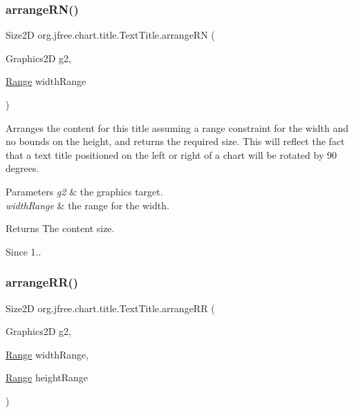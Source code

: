 \subsubsection{\texorpdfstring{arrange\+R\+N()}{arrangeRN()}}
{\footnotesize\ttfamily Size2D org.\+jfree.\+chart.\+title.\+Text\+Title.\+arrange\+RN (\begin{DoxyParamCaption}\item[{Graphics2D}]{g2,  }\item[{\mbox{\hyperlink{classorg_1_1jfree_1_1data_1_1_range}{Range}}}]{width\+Range }\end{DoxyParamCaption})\hspace{0.3cm}{\ttfamily [protected]}}

Arranges the content for this title assuming a range constraint for the width and no bounds on the height, and returns the required size. This will reflect the fact that a text title positioned on the left or right of a chart will be rotated by 90 degrees.


\begin{DoxyParams}{Parameters}
{\em g2} & the graphics target. \\
\hline
{\em width\+Range} & the range for the width.\\
\hline
\end{DoxyParams}
\begin{DoxyReturn}{Returns}
The content size.
\end{DoxyReturn}
\begin{DoxySince}{Since}
1.. 
\end{DoxySince}
\mbox{\label{classorg_1_1jfree_1_1chart_1_1title_1_1_text_title_a6ab494af02c8a1f60f2a7b2a4c086b88}} 
\subsubsection{\texorpdfstring{arrange\+R\+R()}{arrangeRR()}}
{\footnotesize\ttfamily Size2D org.\+jfree.\+chart.\+title.\+Text\+Title.\+arrange\+RR (\begin{DoxyParamCaption}\item[{Graphics2D}]{g2,  }\item[{\mbox{\hyperlink{classorg_1_1jfree_1_1data_1_1_range}{Range}}}]{width\+Range,  }\item[{\mbox{\hyperlink{classorg_1_1jfree_1_1data_1_1_range}{Range}}}]{height\+Range }\end{DoxyParamCaption})\hspace{0.3cm}{\ttfamily [protected]}}

